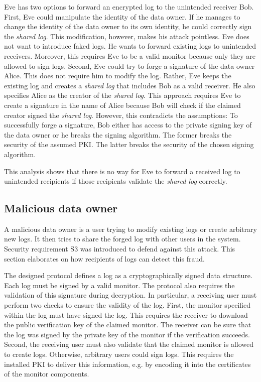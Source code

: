 \documentclass[../main.tex]{subfiles}
\begin{document}
Eve has two options to forward an encrypted log to the unintended receiver Bob.
First, Eve could manipulate the identity of the data owner.
If he manages to change the identity of the data owner to its own identity, he could correctly sign the \emph{shared log}.
This modification, however, makes his attack pointless.
Eve does not want to introduce faked logs.
He wants to forward existing logs to unintended receivers.
Moreover, this requires Eve to be a valid monitor because only they are allowed to sign logs.
Second, Eve could try to forge a signature of the data owner Alice.
This does not require him to modify the log.
Rather, Eve keeps the existing log and creates a \emph{shared log} that includes Bob as a valid receiver.
He also specifies Alice as the creator of the \emph{shared log}.
This approach requires Eve to create a signature in the name of Alice because Bob will check if the claimed creator signed the \emph{shared log}.
However, this contradicts the assumptions:
To successfully forge a signature, Bob either has access to the private signing key of the data owner or he breaks the signing algorithm.
The former breaks the security of the assumed PKI.
The latter breaks the security of the chosen signing algorithm.

This analysis shows that there is no way for Eve to forward a received log to unintended recipients if those recipients validate the \emph{shared log} correctly.


\subsection{Malicious data owner}
A malicious data owner is a user trying to modify existing logs or create arbitrary new logs.
It then tries to share the forged log with other users in the system.
Security requirement S3 was introduced to defend against this attack.
This section elaborates on how recipients of logs can detect this fraud.

The designed protocol defines a log as a cryptographically signed data structure.
Each log must be signed by a valid monitor.
The protocol also requires the validation of this signature during decryption.
In particular, a receiving user must perform two checks to ensure the validity of the log.
First, the monitor specified within the log must have signed the log.
This requires the receiver to download the public verification key of the claimed monitor.
The receiver can be sure that the log was signed by the private key of the monitor if the verification succeeds.
Second, the receiving user must also validate that the claimed monitor is allowed to create logs.
Otherwise, arbitrary users could sign logs.
This requires the installed PKI to deliver this information, e.g. by encoding it into the certificates of the monitor components.
\end{document}
